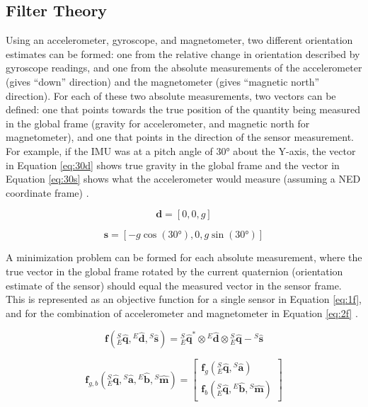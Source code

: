 \documentclass[11pt]{ucthesisCP}
\begin{document}
\subsection{Filter Theory} \label{ssec:4s4s2}
Using an accelerometer, gyroscope, and magnetometer, two different orientation estimates can be formed: one from the relative change in orientation described by gyroscope readings, and one from the absolute measurements of the accelerometer (gives “down” direction) and the magnetometer (gives “magnetic north” direction). For each of these two absolute measurements, two vectors can be defined: one that points towards the true position of the quantity being measured in the global frame (gravity for accelerometer, and magnetic north for magnetometer), and one that points in the direction of the sensor measurement. For example, if the IMU was at a pitch angle of 30° about the Y-axis, the vector in Equation \ref{eq:30d} shows true gravity in the global frame and the vector in Equation \ref{eq:30s} shows what the accelerometer would measure (assuming a NED coordinate frame) \cite{madgwick}.

\begin{equation} \label{eq:30d}
\mathbf{d}= [0, 0, g]
\end{equation}

\begin{equation} \label{eq:30s}
\mathbf{s}= [-g \cos(30°), 0, g \sin(30°)]
\end{equation}

A minimization problem can be formed for each absolute measurement, where the true vector in the global frame rotated by the current quaternion (orientation estimate of the sensor) should equal the measured vector in the sensor frame. This is represented as an objective function for a single sensor in Equation \ref{eq:1f}, and for the combination of accelerometer and magnetometer in Equation \ref{eq:2f} \cite{madgwick}.

\begin{equation} \label{eq:1f}
\mathbf{f}({}^S_E\hat{\mathbf{q}}, {}^E\hat{\mathbf{d}}, {}^S\hat{\mathbf{s}}) = {}^S_E\hat{\mathbf{q}}^* \otimes  {}^E\hat{\mathbf{d}} \otimes {}^S_E\hat{\mathbf{q}} - {}^S\hat{\mathbf{s}}
\end{equation}

\begin{equation} \label{eq:2f}
\mathbf{f}_{g,b}({}^S_E\hat{\mathbf{q}}, {}^S\hat{\mathbf{a}}, {}^E\hat{\mathbf{b}}, {}^S\hat{\mathbf{m}}) = \begin{bmatrix}
	\mathbf{f}_g({}^S_E\hat{\mathbf{q}}, {}^S\hat{\mathbf{a}})\\
	\mathbf{f}_b({}^S_E\hat{\mathbf{q}}, {}^E\hat{\mathbf{b}}, {}^S\hat{\mathbf{m}})
\end{bmatrix}
\end{equation}
\end{document}
